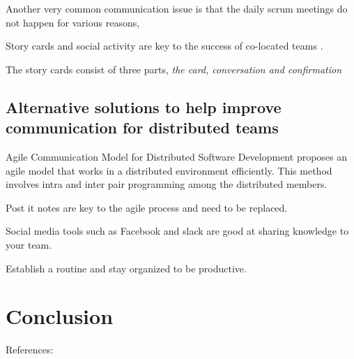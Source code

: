 \documentclass{scrartcl}
\begin{document}
Another very common communication issue is that the daily scrum meetings do not happen for various reasons, 

Story cards and social activity are key to the success of co-located teams \cite{abdullah2011}. 


The story cards consist of three parts, \textit{the card, conversation and confirmation} \cite{abdullah2011}


\subsection{Alternative solutions to help improve communication for distributed teams}

Agile Communication Model for Distributed Software Development \cite{bhalerao2009} proposes an agile model that works in a distributed environment efficiently. This method involves intra and inter pair programming among the distributed members.

Post it notes are key to the agile process and need to be replaced.

Social media tools such as Facebook and slack are good at sharing knowledge to your team.

 Establish a routine and stay organized to be productive.

\section{Conclusion}


References:
\cite{bhalerao2010}
\cite{scharff2012}
\cite{abdullah2011}
\cite{joshi2013}
\cite{krasteva2008}
\cite{williams2012}
\cite{marjaie2011}
\cite{kumar2015}



\end{document}
